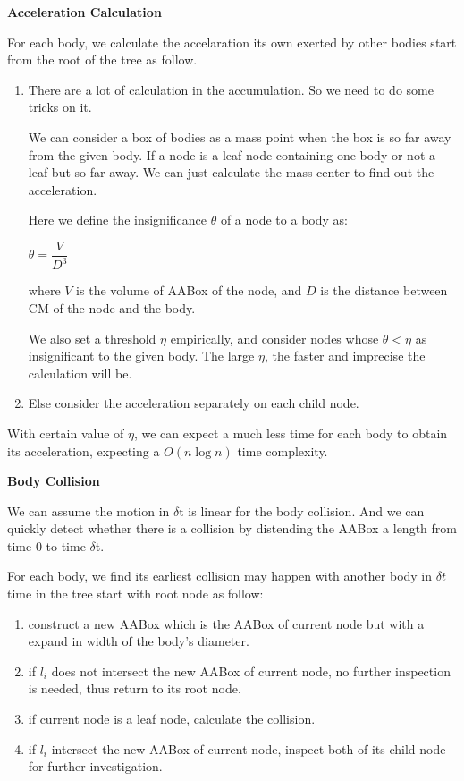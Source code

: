 \documentclass{article}
\newcommand{\centerize}[1]{\begin{center} #1 \end{center}}
\begin{document}
\begin{description}
					\item {\bf Acceleration Calculation}

						For each body, we calculate the accelaration its own
						exerted by other bodies start from the root of the
						tree as follow.

						\begin{enumerate}
							\item
								There are a lot of calculation in the accumulation.
								So we need to do some tricks on it.

								We can consider a box of bodies as a mass point
								when the box is so far away from the given body.
								If a node is a leaf node containing one body
								or not a leaf but so far away. We can just
								calculate the mass center to find out the acceleration.

								Here we define the insignificance $\theta$ of a
								node to a body as: \centerize{$\theta =
								\dfrac{V}{D^3}$} where $V$ is the volume of
								AABox of the node, and $D$ is the distance
								between CM of the node and the body.

								We also set a threshold $\eta$ empirically, and
								consider nodes whose $\theta < \eta$ as
								insignificant to the given body.  The large
								$\eta$, the faster and imprecise the
								calculation will be.

							\item
								Else consider the acceleration separately on
								each child node.
						\end{enumerate}

						With certain value of $\eta$, we can expect a much less
						time for each body to obtain its acceleration, expecting
						a $O(n \log{n})$ time complexity.

					\item {\bf Body Collision}

						We can assume the motion in $\delta$t is linear for the
						body collision. And we can quickly detect whether there
						is a collision by distending the AABox a length from
						time 0 to time $\delta$t.

						For each body, we find its earliest collision may
						happen with another body in $\delta t$ time in the tree
						start with root node as follow:
						\begin{enumerate}
							\item construct a new AABox which is the AABox of
								current node but with a expand in width of the
								body's diameter.
							\item if $l_i$ does not intersect the new AABox of
								current node, no further inspection is needed,
								thus return to its root node.
							\item if current node is a leaf node, calculate the
								collision.
							\item if $l_i$ intersect the new AABox of current node,
								inspect both of its child node for further
								investigation.
						\end{enumerate}


\end{description}
\end{document}
